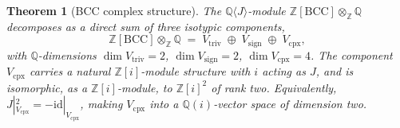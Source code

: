\documentclass[11pt,reqno]{amsart}
\theoremstyle{plain}
\newtheorem{theorem}{Theorem}[section]
\theoremstyle{definition}
\theoremstyle{remark}
\numberwithin{equation}{section}
\newcommand{\BCC}{\mathrm{BCC}}
\newcommand{\Vtriv}{V_{\mathrm{triv}}}
\newcommand{\Vsign}{V_{\mathrm{sign}}}
\newcommand{\Vcpx}{V_{\mathrm{cpx}}}
\begin{document}
\begin{theorem}[BCC complex structure]
\label{thm:bcc-cpx}
The $\mathbb{Q}\langle J \rangle$-module
$\mathbb{Z}[\BCC] \otimes_{\mathbb{Z}} \mathbb{Q}$ decomposes as a
direct sum of three isotypic components,
\begin{equation}
\label{eq:isotypic}
  \mathbb{Z}[\BCC] \otimes_{\mathbb{Z}} \mathbb{Q}
   \;=\;
  \Vtriv \;\oplus\; \Vsign \;\oplus\; \Vcpx,
\end{equation}
with $\mathbb{Q}$-dimensions $\dim \Vtriv = 2$, $\dim \Vsign = 2$,
$\dim \Vcpx = 4$. The component $\Vcpx$ carries a natural
$\mathbb{Z}[i]$-module structure with $i$ acting as $J$, and is
isomorphic, as a $\mathbb{Z}[i]$-module, to $\mathbb{Z}[i]^{2}$ of
rank two. Equivalently, $J|_{\Vcpx}^{2} = -\mathrm{id}|_{\Vcpx}$,
making $\Vcpx$ into a $\mathbb{Q}(i)$-vector space of dimension two.
\end{theorem}
\end{document}
